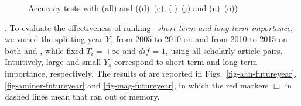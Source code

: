\begin{figure}[tb!]
\begin{center}
\end{center}
\vspace{-3.5ex}
\caption{\small Accuracy tests with \fcita (all) and \recom ((d)--(e), (i)--(j) and (n)--(o))}
\label{fig-pairacc}
\vspace{-2.5ex}
\end{figure}




.
To evaluate the effectiveness of ranking \wrt\ {\em short-term and long-term importance},
we varied the splitting year $Y_s$ from 2005 to 2010 on \aan and from 2010 to 2015 on both \aminer and \magdata, while fixed $T_i$ = $+\infty$ and $dif$ = $1$, \ie using all scholarly article pairs.
%
Intuitively, large and small $Y_s$ correspond to short-term and long-term importance, respectively.
The results of \PairAcc are reported in Figs.~\ref{fig-aan-futureyear}, \ref{fig-aminer-futureyear} and \ref{fig-mag-futureyear}, in which the red markers $\Box$ in dashed lines mean that \hhgrank ran out of memory.


